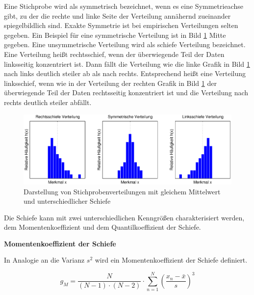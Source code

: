 \noindent Eine Stichprobe wird als symmetrisch bezeichnet, wenn es eine Symmetrieachse gibt, zu der die rechte und linke Seite der Verteilung ann\"{a}hernd zueinander spiegelbildlich sind. Exakte Symmetrie ist bei empirischen Verteilungen selten gegeben. Ein Beispiel f\"{u}r eine symmetrische Verteilung ist in Bild \ref{fig:DefinitionSchiefe} Mitte gegeben. Eine unsymmetrische Verteilung wird als schiefe Verteilung bezeichnet. Eine Verteilung hei{\ss}t rechtsschief, wenn der \"{u}berwiegende Teil der Daten linksseitig konzentriert ist. Dann f\"{a}llt die Verteilung wie die linke Grafik in Bild \ref{fig:DefinitionSchiefe} nach links deutlich steiler ab als nach rechts. Entsprechend hei{\ss}t eine Verteilung linksschief, wenn wie in der Verteilung der rechten Grafik in Bild \ref{fig:DefinitionSchiefe} der \"{u}berwiegende Teil der Daten rechtsseitig konzentriert ist und die Verteilung nach rechts deutlich steiler abf\"{a}llt.

\noindent 
\begin{figure}[H]
  \centerline{\includegraphics[width=1\textwidth]{Kapitel3/Bilder/image10}}
  \caption{Darstellung von Stichprobenverteilungen mit gleichem Mittelwert und unterschiedlicher Schiefe}
  \label{fig:DefinitionSchiefe}
\end{figure}

\noindent Die Schiefe kann mit zwei unterschiedlichen Kenngr\"{o}{\ss}en charakterisiert werden, dem Momentenkoeffizient und dem Quantilkoeffizient der Schiefe.

\clearpage

{\selectfont
\noindent\textbf{Momentenkoeffizient der Schiefe}}

\noindent In Analogie an die Varianz $s^{2}$ wird ein Momentenkoeffizient der Schiefe definiert.

\begin{equation}\label{eq:threefourtynine}
g_{M} =\dfrac{N}{(N-1)\cdot (N-2)} \cdot \sum _{n=1}^{N}(\dfrac{x_{n} -\bar{x}}{s} ) ^{3} 
\end{equation} 

